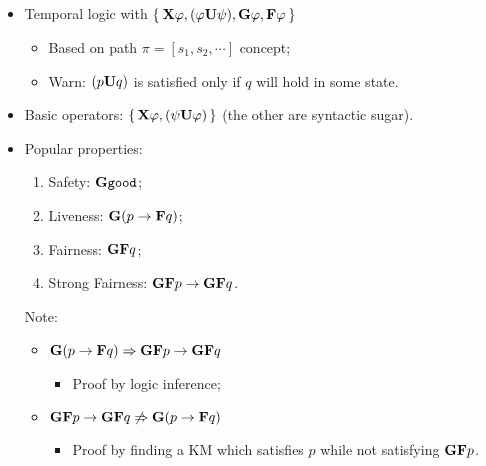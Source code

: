 \subsection{\LTL}

    \begin{itemize}

    \item   Temporal logic with
            $\Set{ \mathcal{\sf \bf X}\varphi, ({\varphi}\mathcal{\sf \bf U}{\psi}), \mathcal{\sf \bf G}\varphi, \mathcal{\sf \bf F}\varphi }$

        \begin{itemize}
        \item   Based on path $\pi = [s_1, s_2, \cdots ]$ concept;
        \item   Warn: $({p}\mathcal{\sf \bf U}{q})$ is satisfied only if $q$ will hold in
                some state.
        \end{itemize}

    \item   Basic operators: $\set{ \mathcal{\sf \bf X}\varphi, ({\psi}\mathcal{\sf \bf U}{\varphi}) }$ (the other
            are syntactic sugar).

    \item   Popular properties:

        \begin{enumerate}
        \item   Safety: $\mathcal{\sf \bf G}\mathcal{{\tt good}}$;
        \item   Liveness: $\mathcal{\sf \bf G}(p \rightarrow \mathcal{\sf \bf F}q)$;
        \item   Fairness: $\mathcal{\sf \bf G}\mathcal{\sf \bf F}q$;
        \item   Strong Fairness: $\mathcal{\sf \bf G}\mathcal{\sf \bf F}p \rightarrow \mathcal{\sf \bf G}\mathcal{\sf \bf F}q$.
        \end{enumerate}

        Note:
        \begin{itemize}
        \item   $\mathcal{\sf \bf G}(p \rightarrow \mathcal{\sf \bf F}q) \Rightarrow \mathcal{\sf \bf G}\mathcal{\sf \bf F}p \rightarrow \mathcal{\sf \bf G}\mathcal{\sf \bf F}q$
            \begin{itemize}
            \item   Proof by logic inference;
            \end{itemize}
        \item   $\mathcal{\sf \bf G}\mathcal{\sf \bf F}p \rightarrow \mathcal{\sf \bf G}\mathcal{\sf \bf F}q \not\Rightarrow
                 \mathcal{\sf \bf G}(p \rightarrow \mathcal{\sf \bf F}q)$
            \begin{itemize}
                \item   Proof by finding a KM which satisfies $p$ while not
                        satisfying $\mathcal{\sf \bf G}\mathcal{\sf \bf F}p$.
            \end{itemize}
        \end{itemize}

    \end{itemize}

